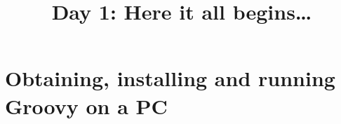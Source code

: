 \documentclass{article}
\begin{document}
\title{Day 1: Here it all begins\ldots}
\date{}
\maketitle








\newpage
\appendix
\section{Obtaining, installing and running Groovy on a PC}

\label{sec:obta-inst-runn}
\end{document}

